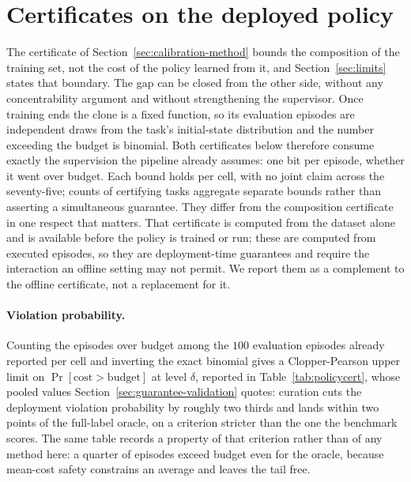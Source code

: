\documentclass{article} %
\begin{document}
\section{Certificates on the deployed policy}
\label{app:policycert}

The certificate of Section~\ref{sec:calibration-method} bounds the composition of the
training set, not the cost of the policy learned from it, and Section~\ref{sec:limits}
states that boundary. The gap can be closed from the other side, without any
concentrability argument \citep{rashidinejad2022bridging,xie2021policy,zhan2022offline} and without
strengthening the supervisor. Once training ends
the clone is a fixed function, so its evaluation episodes are independent draws from the
task's initial-state distribution and the number exceeding the budget is binomial. Both
certificates below therefore consume exactly the supervision the pipeline already
assumes: one bit per episode, whether it went over budget. Each bound holds per cell,
with no joint claim across the seventy-five; counts of certifying tasks aggregate
separate bounds rather than asserting a simultaneous guarantee. They differ from the
composition certificate in one respect that matters. That certificate is computed from
the dataset alone and is available before the policy is trained or run; these are
computed from executed episodes, so they are deployment-time guarantees and require
the interaction an offline setting may not permit. We report them as a complement to
the offline certificate, not a replacement for it.

\paragraph{Violation probability.} Counting the episodes over budget among the $100$ evaluation episodes already
reported per cell and inverting the exact binomial gives a Clopper-Pearson upper limit on
$\Pr[\text{cost} > \text{budget}]$ at level $\delta$, reported in
Table~\ref{tab:policycert}, whose pooled values Section~\ref{sec:guarantee-validation}
quotes: curation cuts the deployment violation probability by roughly two thirds and
lands within two points of the full-label oracle, on a criterion stricter than the one the
benchmark scores. The same table records
a property of that criterion rather than of any method here: a quarter of episodes
exceed budget even for the oracle, because mean-cost safety constrains an average and
leaves the tail free.
\end{document}
